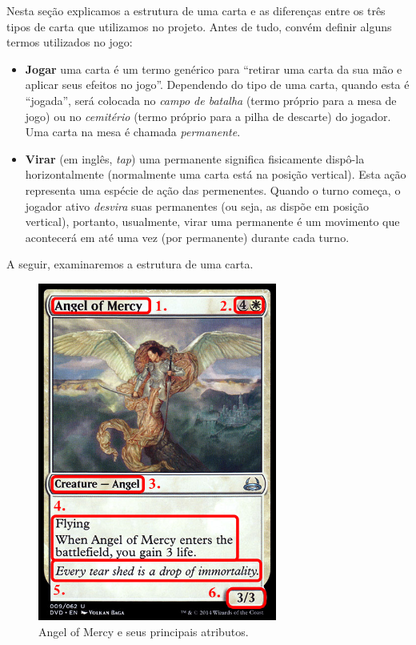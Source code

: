 Nesta seção explicamos a estrutura de uma carta e as diferenças entre os três tipos de carta que utilizamos no projeto. Antes de tudo, convém definir alguns termos utilizados no jogo:

\begin{itemize}
  \item \textbf{Jogar} uma carta é um termo genérico para ``retirar uma carta da sua mão e aplicar seus efeitos no jogo''. Dependendo do tipo de uma carta, quando esta é ``jogada'', será colocada no \textit{campo de batalha} (termo próprio para a mesa de jogo) ou no \textit{cemitério} (termo próprio para a pilha de descarte) do jogador. Uma carta na mesa é chamada \textit{permanente}.
  \item \textbf{Virar} (em inglês, \textit{tap}) uma permanente significa fisicamente dispô-la horizontalmente (normalmente uma carta está na posição vertical). Esta ação representa uma espécie de ação das permenentes. Quando o turno começa, o jogador ativo \textit{desvira} suas permanentes (ou seja, as dispõe em posição vertical), portanto, usualmente, virar uma permanente é um movimento que acontecerá em até uma vez (por permanente) durante cada turno.
\end{itemize}

A seguir, examinaremos a estrutura de uma carta.

\begin{figure}[!ht]
    \centering
    \includegraphics[width=0.7\textwidth]{picstcc/angelnumbers.png}
    \caption{Angel of Mercy e seus principais atributos.}
    \label{cardinfo}
\end{figure}

